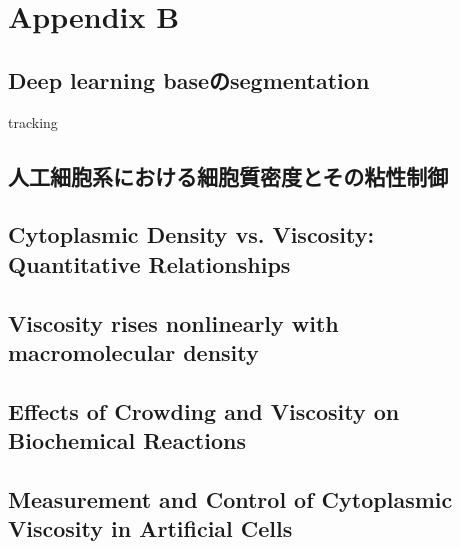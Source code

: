 \chapter*{Appendix B}
\section{Deep learning baseのsegmentation}

tracking
\section{人工細胞系における細胞質密度とその粘性制御}

\section{Cytoplasmic Density vs. Viscosity: Quantitative Relationships}

\section{Viscosity rises nonlinearly with macromolecular density}

\section{Effects of Crowding and Viscosity on Biochemical Reactions}

\section{Measurement and Control of Cytoplasmic Viscosity in Artificial Cells}

